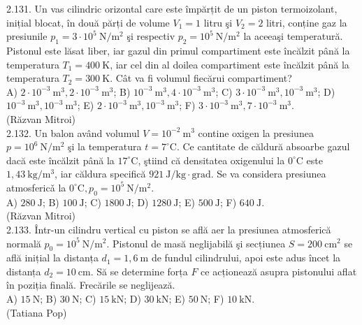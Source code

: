 2.131. Un vas cilindric orizontal care este împărțit de un piston termoizolant, inițial blocat, în două părți de volume $V_{1}=1$ litru şi $V_{2}=2$ litri, conține gaz la presiunile $p_{1}=3 \cdot 10^{5} \mathrm{~N} / \mathrm{m}^{2}$ şi respectiv $p_{2}=10^{5} \mathrm{~N} / \mathrm{m}^{2}$ la aceeaşi temperatură. Pistonul este lăsat liber, iar gazul din primul compartiment este încălzit până la temperatura $T_{1}=400 \mathrm{~K}$, iar cel din al doilea compartiment este încălzit până la temperatura $T_{2}=300 \mathrm{~K}$. Cât va fi volumul fiecărui compartiment?\\ A) $2 \cdot 10^{-3} \mathrm{~m}^{3}, 2 \cdot 10^{-3} \mathrm{~m}^{3}$; B) $10^{-3} \mathrm{~m}^{3}, 4 \cdot 10^{-3} \mathrm{~m}^{3}$; C) $3 \cdot 10^{-3} \mathrm{~m}^{3}, 10^{-3} \mathrm{~m}^{3}$; D) $10^{-3} \mathrm{~m}^{3}, 10^{-3} \mathrm{~m}^{3}$; E) $2 \cdot 10^{-3} \mathrm{~m}^{3}, 10^{-3} \mathrm{~m}^{3}$; F) $3 \cdot 10^{-3} \mathrm{~m}^{3}, 7 \cdot 10^{-3} \mathrm{~m}^{3}$.\\ (Răzvan Mitroi)\\

2.132. Un balon având volumul $V=10^{-2} \mathrm{~m}^{3}$ contine oxigen la presiunea $p=10^{6} \mathrm{~N} / \mathrm{m}^{2}$ şi la temperatura $t=7^{\circ} \mathrm{C}$. Ce cantitate de căldură absoarbe gazul dacă este încălzit până la $17^{\circ} \mathrm{C}$, ştiind că densitatea oxigenului la $0^{\circ} \mathrm{C}$ este $1,43 \mathrm{~kg} / \mathrm{m}^{3}$, iar căldura specifică $921 \mathrm{~J} / \mathrm{kg} \cdot \mathrm{grad}$. Se va considera presiunea atmosfericǎ la $0^{\circ} \mathrm{C}, p_{0}=10^{5} \mathrm{~N} / \mathrm{m}^{2}$.\\ A) $280 \mathrm{~J}$; B) $100 \mathrm{~J}$; C) $1800 \mathrm{~J}$; D) $1280 \mathrm{~J}$; E) $500 \mathrm{~J}$; F) $640 \mathrm{~J}$.\\ (Răzvan Mitroi)\\

2.133. Într-un cilindru vertical cu piston se află aer la presiunea atmosferică normală $p_{0}=10^{5} \mathrm{~N} / \mathrm{m}^{2}$. Pistonul de masă neglijabilă şi secțiunea $S=200 \mathrm{~cm}^{2}$ se află inițial la distanța $d_{1}=1,6 \mathrm{~m}$ de fundul cilindrului, apoi este adus încet la distanța $d_{2}=10 \mathrm{~cm}$. Să se determine forța $F$ ce acționează asupra pistonului aflat în poziția finală. Frecările se neglijează.\\ A) $15 \mathrm{~N}$; B) $30 \mathrm{~N}$; C) $15 \mathrm{~kN}$; D) $30 \mathrm{~kN}$; E) $50 \mathrm{~N}$; F) $10 \mathrm{~kN}$.\\ (Tatiana Pop)\\

